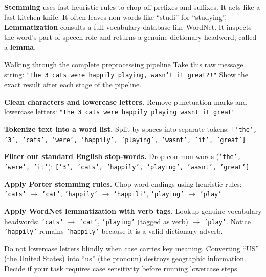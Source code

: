 \documentclass[a4paper,11pt]{article}
\newcommand{\vocab}[1]{\textbf{#1}}
\begin{document}
\begin{intuition}
\vocab{Stemming} uses fast heuristic rules to chop off prefixes and suffixes.
It acts like a fast kitchen knife.
It often leaves non-words like ``studi'' for ``studying''.
\vocab{Lemmatization} consults a full vocabulary database like WordNet.
It inspects the word's part-of-speech role and returns a genuine dictionary headword, called a \vocab{lemma}.
\end{intuition}

\begin{worked}{Walking through the complete preprocessing pipeline}
Take this raw message string: \texttt{"The 3 cats were happily playing, wasn't it great?!"}
Show the exact result after each stage of the pipeline.
\begin{steps}
  \item \textbf{Clean characters and lowercase letters.}
        Remove punctuation marks and lowercase letters:
        \texttt{"the 3 cats were happily playing wasnt it great"}
  \item \textbf{Tokenize text into a word list.}
        Split by spaces into separate tokens:
        \texttt{['the', '3', 'cats', 'were', 'happily', 'playing', 'wasnt', 'it', 'great']}
  \item \textbf{Filter out standard English stop-words.}
        Drop common words (\texttt{'the', 'were', 'it'}):
        \texttt{['3', 'cats', 'happily', 'playing', 'wasnt', 'great']}
  \item \textbf{Apply Porter stemming rules.}
        Chop word endings using heuristic rules:
        \texttt{'cats'} $\rightarrow$ \texttt{'cat'}, \texttt{'happily'} $\rightarrow$ \texttt{'happili'}, \texttt{'playing'} $\rightarrow$ \texttt{'play'}.
  \item \textbf{Apply WordNet lemmatization with verb tags.}
        Lookup genuine vocabulary headwords:
        \texttt{'cats'} $\rightarrow$ \texttt{'cat'}, \texttt{'playing'} (tagged as verb) $\rightarrow$ \texttt{'play'}.
        Notice \texttt{'happily'} remains \texttt{'happily'} because it is a valid dictionary adverb.
\end{steps}
\end{worked}

\begin{watchout}
Do not lowercase letters blindly when case carries key meaning.
Converting ``US'' (the United States) into ``us'' (the pronoun) destroys geographic information.
Decide if your task requires case sensitivity before running lowercase steps.
\end{watchout}
\end{document}
